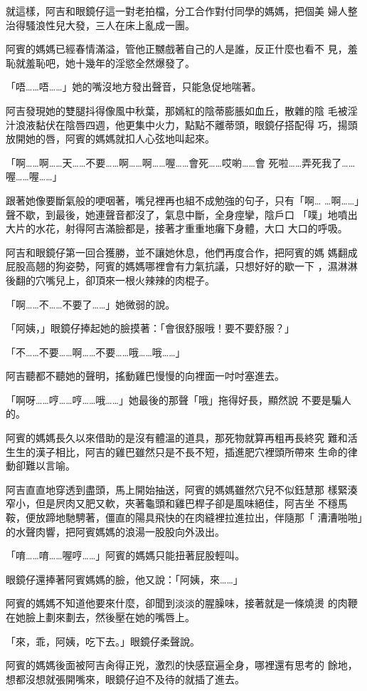 就這樣，阿吉和眼鏡仔這一對老拍檔，分工合作對付同學的媽媽，把個美
婦人整治得騷浪性兒大發，三人在床上亂成一團。

阿賓的媽媽已經春情滿溢，管他正嬲戲著自己的人是誰，反正什麼也看不
見，羞恥就羞恥吧，她十幾年的淫慾全然爆發了。

「唔……唔……」她的嘴沒地方發出聲音，只能急促地喘著。

阿吉發現她的雙腿抖得像風中秋葉，那嫣紅的陰蒂膨脹如血丘，散雜的陰
毛被淫汁浪液黏伏在陰唇四週，他更集中火力，點點不離蒂頭，眼鏡仔搭配得
巧，揚頭放開她的唇，阿賓的媽媽就扣人心弦地叫起來。

「啊……啊……天……不要……啊……啊……喔……會死……哎喲……會
死啦……弄死我了……喔……喔……」

跟著她像要斷氣般的哽咽著，嘴兒裡再也組不成勉強的句子，只有「啊…
…啊……」聲不歇，到最後，她連聲音都沒了，氣息中斷，全身痙攣，陰戶口
「噗」地噴出大片的水花，射得阿吉滿臉都是，接著才重重地癱下身體，大口
大口的呼吸。

阿吉和眼鏡仔第一回合獲勝，並不讓她休息，他們再度合作，把阿賓的媽
媽翻成屁股高翹的狗姿勢，阿賓的媽媽哪裡會有力氣抗議，只想好好的歇一下
，濕淋淋後翻的穴嘴兒上，卻頂來一根火辣辣的肉棍子。

「啊……不……不要了……」她微弱的說。

「阿姨，」眼鏡仔捧起她的臉摸著：「會很舒服哦！要不要舒服？」

「不……不要……啊……不要……哦……哦……」

阿吉聽都不聽她的聲明，搖動雞巴慢慢的向裡面一吋吋塞進去。

「啊呀……哼……哼……哦……」她最後的那聲「哦」拖得好長，顯然說
不要是騙人的。

阿賓的媽媽長久以來借助的是沒有體溫的道具，那死物就算再粗再長終究
難和活生生的漢子相比，阿吉的雞巴雖然只是不長不短，插進肥穴裡頭所帶來
生命的律動卻難以言喻。

阿吉直直地穿透到盡頭，馬上開始抽送，阿賓的媽媽雖然穴兒不似鈺慧那
樣緊湊窄小，但是屄肉又肥又軟，夾著龜頭和雞巴桿子卻是風味絕佳，阿吉坐
不穩馬鞍，便放蹄地馳騁著，僵直的陽具飛快的在肉縫裡拉進拉出，伴隨那「
漕漕啪啪」的水聲肉響，把阿賓媽媽的浪湯一股股向外汲出。

「唷……唷……喔哼……」阿賓的媽媽只能扭著屁股輕叫。

眼鏡仔還捧著阿賓媽媽的臉，他又說：「阿姨，來……」

阿賓的媽媽不知道他要來什麼，卻聞到淡淡的腥臊味，接著就是一條燒燙
的肉鞭在她臉上劃來劃去，然後壓在她的嘴唇上。

「來，乖，阿姨，吃下去。」眼鏡仔柔聲說。

阿賓的媽媽後面被阿吉肏得正兇，激烈的快感竄遍全身，哪裡還有思考的
餘地，想都沒想就張開嘴來，眼鏡仔迫不及待的就插了進去。

